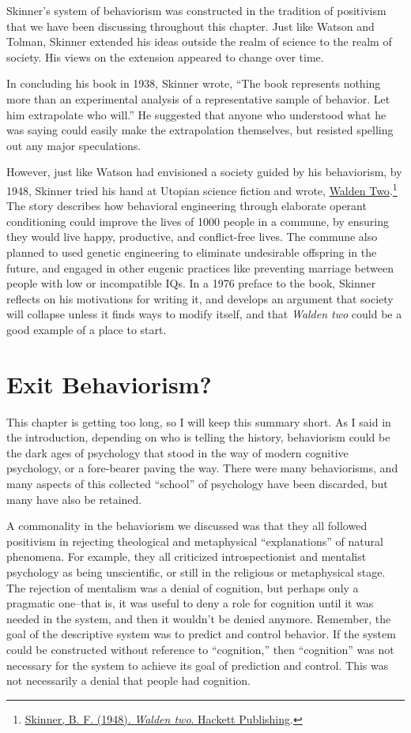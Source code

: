 \documentclass[
  oneside,
  12pt]{crumpbook}
\begin{document}
Skinner's system of behaviorism was constructed in the tradition of positivism that we have been discussing throughout this chapter. Just like Watson and Tolman, Skinner extended his ideas outside the realm of science to the realm of society. His views on the extension appeared to change over time.

In concluding his book in 1938, Skinner wrote, ``The book represents nothing more than an experimental analysis of a representative sample of behavior. Let him extrapolate who will.'' He suggested that anyone who understood what he was saying could easily make the extrapolation themselves, but resisted spelling out any major speculations.

However, just like Watson had envisioned a society guided by his behaviorism, by 1948, Skinner tried his hand at Utopian science fiction and wrote, \href{https://en.wikipedia.org/wiki/Walden_Two}{Walden Two}.\footnote{\protect\hyperlink{ref-skinnerWaldenTwo1948}{Skinner, B. F. (1948). \emph{Walden two}. {Hackett Publishing}}.} The story describes how behavioral engineering through elaborate operant conditioning could improve the lives of 1000 people in a commune, by ensuring they would live happy, productive, and conflict-free lives. The commune also planned to used genetic engineering to eliminate undesirable offspring in the future, and engaged in other eugenic practices like preventing marriage between people with low or incompatible IQs. In a 1976 preface to the book, Skinner reflects on his motivations for writing it, and develops an argument that society will collapse unless it finds ways to modify itself, and that \emph{Walden two} could be a good example of a place to start.

\hypertarget{exit-behaviorism}{%
\section{Exit Behaviorism?}\label{exit-behaviorism}}

This chapter is getting too long, so I will keep this summary short. As I said in the introduction, depending on who is telling the history, behaviorism could be the dark ages of psychology that stood in the way of modern cognitive psychology, or a fore-bearer paving the way. There were many behaviorisms, and many aspects of this collected ``school'' of psychology have been discarded, but many have also be retained.

A commonality in the behaviorism we discussed was that they all followed positivism in rejecting theological and metaphysical ``explanations'' of natural phenomena. For example, they all criticized introspectionist and mentalist psychology as being unscientific, or still in the religious or metaphysical stage. The rejection of mentalism was a denial of cognition, but perhaps only a pragmatic one--that is, it was useful to deny a role for cognition until it was needed in the system, and then it wouldn't be denied anymore. Remember, the goal of the descriptive system was to predict and control behavior. If the system could be constructed without reference to ``cognition,'' then ``cognition'' was not necessary for the system to achieve its goal of prediction and control. This was not necessarily a denial that people had cognition.
\end{document}
